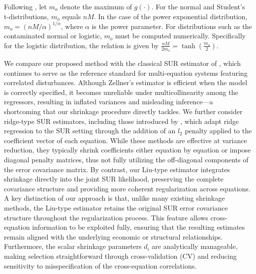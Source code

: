 \documentclass{article}
\begin{document}
Following \cite{Galea2000}, let $m_o$ denote the maximum of $g(\cdot)$. For the normal and Student's t-distributions, $m_o$ equals $nM$. In the case of the power exponential distribution, $m_o = (nM/\alpha)^{1/\alpha}$, where $\alpha$ is the power parameter. For distributions such as the contaminated normal or logistic, $m_o$ must be computed numerically. Specifically for the logistic distribution, the relation is given by
$\frac{nM}{2m_o} = \tanh\left(\frac{m_o}{2}\right).$

We compare our proposed method with the classical SUR estimator of \cite{Zellner1962}, which continues to serve as the reference standard for multi-equation systems featuring correlated disturbances. Although Zellner's estimator is efficient when the model is correctly specified, it becomes unreliable under multicollinearity among the regressors, resulting in inflated variances and misleading inference—a shortcoming that our shrinkage procedure directly tackles. We further consider ridge-type SUR estimators, including those introduced by \cite{Liu2014}, which adapt ridge regression to the SUR setting through the addition of an $l_2$ penalty applied to the coefficient vector of each equation. While these methods are effective at variance reduction, they typically shrink coefficients either equation by equation or impose diagonal penalty matrices, thus not fully utilizing the off-diagonal components of the error covariance matrix. By contrast, our Liu-type estimator integrates shrinkage directly into the joint SUR likelihood, preserving the complete covariance structure and providing more coherent regularization across equations. A key distinction of our approach is that, unlike many existing shrinkage methods, the Liu-type estimator retains the original SUR error covariance structure throughout the regularization process. This feature allows cross-equation information to be exploited fully, ensuring that the resulting estimates remain aligned with the underlying economic or structural relationships. Furthermore, the scalar shrinkage parameters $d_i$ are analytically manageable, making selection straightforward through cross-validation (CV) and reducing sensitivity to misspecification of the cross-equation correlations.
	
\setcounter{equation}{0}
\end{document}
